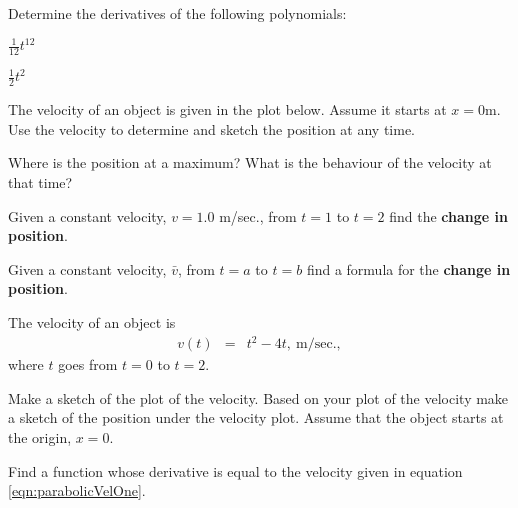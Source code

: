 \begin{problem}
\item Determine the derivatives of the following polynomials:
  \begin{subproblem}
    \item $\frac{1}{12} t^{12}$
      \vfill
    \item $\frac{1}{2} t^{2}$
      \vfill
  \end{subproblem}

\item The velocity of an object is given in the plot below. Assume it
  starts at $x=0$m. Use the velocity to determine and sketch the
  position at any time.

  \scalebox{0.7}{}


  \begin{subproblem}
  \item Where is the position at a maximum? What is the behaviour of
    the velocity at that time?
    \vspace{3em}
  \item Given a constant velocity, $v=1.0$ m/sec., from $t=1$ to $t=2$
    find the \textbf{change in position}.
    \vfill
  \item Given a constant velocity, $\bar{v}$, from $t=a$ to $t=b$ find
    a formula for the \textbf{change in position}.
    \vfill
  \end{subproblem}

\item The velocity of an object is
  \begin{eqnarray}
    \label{eqn:parabolicVelOne}
    v(t) & = & t^2 - 4t, ~ \mathrm{m/sec.},
  \end{eqnarray}
  where $t$ goes from $t=0$ to $t=2$.

  \begin{subproblem}
  \item Make a sketch of the plot of the velocity.  Based on your plot
    of the velocity make a sketch of the position under the velocity
    plot. Assume that the object starts at the origin, $x=0$.

    \vfill

  \item Find a function whose derivative is equal to the velocity
    given in equation \ref{eqn:parabolicVelOne}.


\end{subproblem}
\end{problem}
